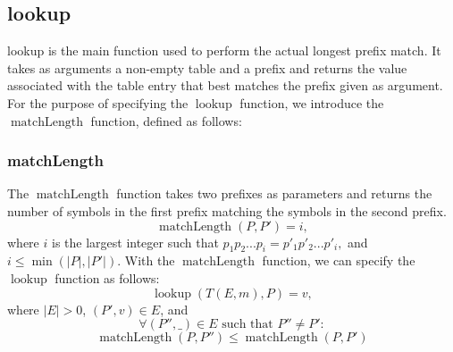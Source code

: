 \documentclass{article}
\DeclareMathOperator{\matchlength}{matchLength}
\DeclareMathOperator{\lookup}{lookup}
\begin{document}
\subsection{lookup}
lookup is the main function used to perform the actual longest prefix match. It
takes as arguments a non-empty table and a prefix and returns the value
associated with the table entry that best matches the prefix given as argument.
For the purpose of specifying the $\lookup$ function, we introduce the
$\matchlength$ function, defined as follows:
\subsubsection{matchLength}
The $\matchlength$ function takes two prefixes as parameters and returns the
number of symbols in the first prefix matching the symbols in the second prefix.
\[
    \matchlength(P, P') = i,
\]
where $i$ is the largest integer such that
\(
p_1p_2...p_i = p'_1p'_2...p'_i,
\)
and $i \leq \min(|P|, |P'|)$. \newline \newline
With the $\matchlength$ function, we can specify the $\lookup$ function as
follows:
\[
    \lookup(T(E, m), P) = v,
\]
where $|E| > 0$, $(P', v) \in E$, and
\[
    \forall (P'', \_) \in E \text{ such that } P'' \neq P' :
\]
\[
    \matchlength(P, P'') \leq \matchlength(P, P')
\]
\end{document}
